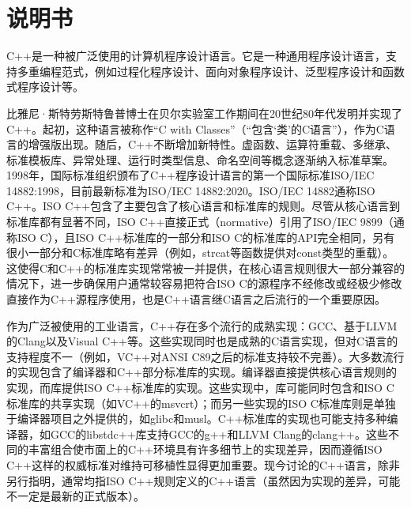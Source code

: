 {\centering
\section{说明书}}

C++是一种被广泛使用的计算机程序设计语言。它是一种通用程序设计语言，支持多重编程范式，例如过程化程序设计、面向对象程序设计、泛型程序设计和函数式程序设计等。

比雅尼·斯特劳斯特鲁普博士在贝尔实验室工作期间在20世纪80年代发明并实现了C++。起初，这种语言被称作“C with Classes”（“包含‘类’的C语言”），作为C语言的增强版出现。随后，C++不断增加新特性。虚函数、运算符重载、多继承、标准模板库、异常处理、运行时类型信息、命名空间等概念逐渐纳入标准草案。1998年，国际标准组织颁布了C++程序设计语言的第一个国际标准ISO/IEC 14882:1998，目前最新标准为ISO/IEC 14882:2020。ISO/IEC 14882通称ISO C++。ISO C++包含了主要包含了核心语言和标准库的规则。尽管从核心语言到标准库都有显著不同，ISO C++直接正式（normative）引用了ISO/IEC 9899（通称ISO C），且ISO C++标准库的一部分和ISO C的标准库的API完全相同，另有很小一部分和C标准库略有差异（例如，strcat等函数提供对const类型的重载）。这使得C和C++的标准库实现常常被一并提供，在核心语言规则很大一部分兼容的情况下，进一步确保用户通常较容易把符合ISO C的源程序不经修改或经极少修改直接作为C++源程序使用，也是C++语言继C语言之后流行的一个重要原因。

作为广泛被使用的工业语言，C++存在多个流行的成熟实现：GCC、基于LLVM的Clang以及Visual C++等。这些实现同时也是成熟的C语言实现，但对C语言的支持程度不一（例如，VC++对ANSI C89之后的标准支持较不完善）。大多数流行的实现包含了编译器和C++部分标准库的实现。编译器直接提供核心语言规则的实现，而库提供ISO C++标准库的实现。这些实现中，库可能同时包含和ISO C标准库的共享实现（如VC++的msvcrt）；而另一些实现的ISO C标准库则是单独于编译器项目之外提供的，如glibc和musl。C++标准库的实现也可能支持多种编译器，如GCC的libstdc++库支持GCC的g++和LLVM Clang的clang++。这些不同的丰富组合使市面上的C++环境具有许多细节上的实现差异，因而遵循ISO C++这样的权威标准对维持可移植性显得更加重要。现今讨论的C++语言，除非另行指明，通常均指ISO C++规则定义的C++语言（虽然因为实现的差异，可能不一定是最新的正式版本）。




\newpage